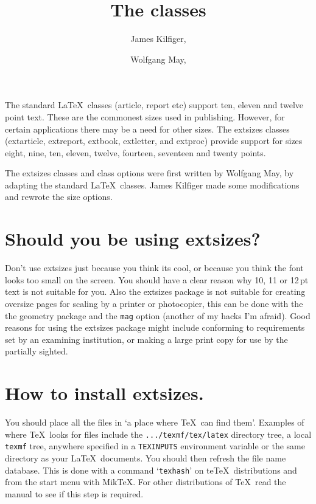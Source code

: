 \documentclass[DIV=9, headings=normal, pagesize=auto]{scrartcl}
\title{The \cls{extsizes} classes}
\author{James Kilfiger, \mail{james.kilfiger@gmail.com}\and Wolfgang May, \mail{may@informatik.uni-goettingen.de}}
\date{}
\newcommand*{\pkg}[1]{\textsf{#1}}
\newcommand*{\cls}[1]{\textsf{#1}}
\newcommand*{\opt}[1]{\texttt{#1}}
\begin{document}
\maketitle

\noindent
The standard \LaTeX\ classes (\cls{article}, \cls{report} etc) support ten, eleven and
twelve point text. These are the commonest sizes used in publishing.
However, for certain applications there may be a need for other sizes.
The \cls{extsizes} classes (\cls{extarticle}, \cls{extreport}, \cls{extbook}, \cls{extletter}, and
\cls{extproc}) provide support for sizes eight, nine, ten, eleven, twelve,
fourteen, seventeen and twenty points.

The \cls{extsizes} classes and class options were first written by Wolfgang
May, by adapting the standard \LaTeX\ classes. James Kilfiger
made some modifications and rewrote the size options. 


\section{Should you be using \cls{extsizes}?}

Don't use \cls{extsizes} just because you think its cool, or because you think
the font looks too small on the screen.  You should have a clear reason
why 10, 11 or 12\,pt text is not suitable for you.  Also the \pkg{extsizes}
package is not suitable for creating oversize pages for scaling by a
printer or photocopier, this can be done with the the \pkg{geometry} package
and the \opt{mag} option (another of my hacks I'm afraid).  Good reasons for
using the \pkg{extsizes} package might include conforming to requirements set
by an examining institution, or making a large print copy for use by the
partially sighted.


\section{How to install \cls{extsizes}.}

You should place all the files in `a place where \TeX\ can find them'.
Examples of where \TeX\ looks for files include the \texttt{.../texmf/tex/latex}
directory tree, a local \texttt{texmf} tree, anywhere specified in a \texttt{TEXINPUTS}
environment variable or the same directory as your \LaTeX\ documents.  
You should then refresh the file name database. This is done with a
command `\texttt{texhash}' on te\TeX\ distributions and from the start menu with
Mik\TeX\@.   For other distributions of \TeX\ read the manual to see if this
step is required.
\end{document}
